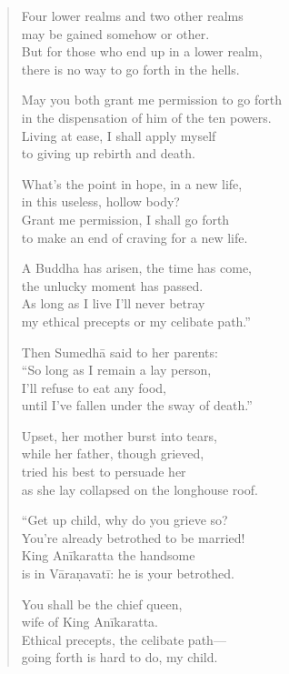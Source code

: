 \documentclass[12pt,openany]{book}%
\begin{document}
\begin{verse}
Four lower realms and two other realms \\
may be gained somehow or other. \\
But for those who end up in a lower realm, \\
there is no way to go forth in the hells. 

May you both grant me permission to go forth \\
in the dispensation of him of the ten powers. \\
Living at ease, I shall apply myself \\
to giving up rebirth and death. 

What’s the point in hope, in a new life, \\
in this useless, hollow body? \\
Grant me permission, I shall go forth \\
to make an end of craving for a new life. 

A Buddha has arisen, the time has come, \\
the unlucky moment has passed. \\
As long as I live I’ll never betray \\
my ethical precepts or my celibate path.” 

Then \textsanskrit{Sumedhā} said to her parents: \\
“So long as I remain a lay person, \\
I’ll refuse to eat any food, \\
until I’ve fallen under the sway of death.” 

Upset, her mother burst into tears, \\
while her father, though grieved, \\
tried his best to persuade her \\
as she lay collapsed on the longhouse roof. 

“Get up child, why do you grieve so? \\
You’re already betrothed to be married! \\
King \textsanskrit{Anīkaratta} the handsome \\
is in \textsanskrit{Vāraṇavatī}: he is your betrothed. 

You shall be the chief queen, \\
wife of King \textsanskrit{Anīkaratta}. \\
Ethical precepts, the celibate path—\\
going forth is hard to do, my child. 


\end{verse}
\end{document}
